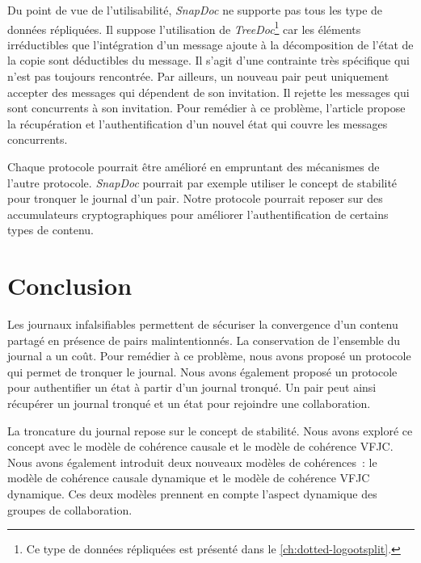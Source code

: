 Du point de vue de l'utilisabilité, \emph{SnapDoc} ne supporte pas tous les type de données répliquées.
Il suppose l'utilisation de \emph{TreeDoc}\footnote{Ce type de données répliquées est présenté dans le \autoref{ch:dotted-logootsplit}.} car les éléments irréductibles que l'intégration d'un message ajoute à la décomposition de l'état de la copie sont déductibles du message.
Il s'agit d'une contrainte très spécifique qui n'est pas toujours rencontrée.
Par ailleurs, un nouveau pair peut uniquement accepter des messages qui dépendent de son invitation.
Il rejette les messages qui sont concurrents à son invitation.
Pour remédier à ce problème, l'article propose la récupération et l'authentification d'un nouvel état qui couvre les messages concurrents.

Chaque protocole pourrait être amélioré en empruntant des mécanismes de l'autre protocole.
\emph{SnapDoc} pourrait par exemple utiliser le concept de stabilité pour tronquer le journal d'un pair.
Notre protocole pourrait reposer sur des accumulateurs cryptographiques pour améliorer l'authentification de certains types de contenu.


\section{Conclusion}

Les journaux infalsifiables permettent de sécuriser la convergence d'un contenu partagé en présence de pairs malintentionnés.
La conservation de l'ensemble du journal a un coût.
Pour remédier à ce problème, nous avons proposé un protocole qui permet de tronquer le journal.
Nous avons également proposé un protocole pour authentifier un état à partir d'un journal tronqué.
Un pair peut ainsi récupérer un journal tronqué et un état pour rejoindre une collaboration.

La troncature du journal repose sur le concept de stabilité.
Nous avons exploré ce concept avec le modèle de cohérence causale et le modèle de cohérence \ac{VFJC}.
Nous avons également introduit deux nouveaux modèles de cohérences~: le modèle de cohérence causale dynamique et le modèle de cohérence \ac{VFJC} dynamique.
Ces deux modèles prennent en compte l'aspect dynamique des groupes de collaboration.

